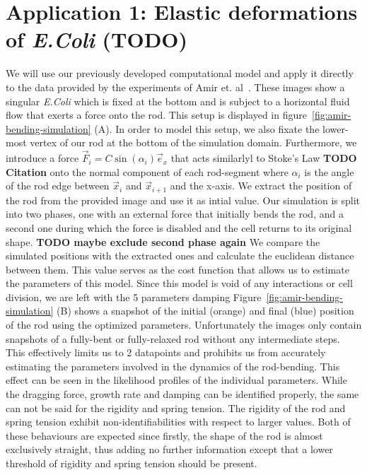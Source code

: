 \documentclass{article}
\begin{document}
\section{Application 1: Elastic deformations of \textit{E.Coli} (TODO)}
\label{section:application-1}

We will use our previously developed computational model and apply it directly to the data provided
by the experiments of Amir et. al~\cite{Amir2014,Amir2014_2}.
These images show a singular \textit{E.Coli} which is fixed at the bottom and is subject to a
horizontal fluid flow that exerts a force onto the rod.
This setup is displayed in figure~\ref{fig:amir-bending-simulation} (A).
In order to model this setup, we also fixate the lower-most vertex of our rod at the bottom of the
simulation domain.
Furthermore, we introduce a force $\vec{F}_i = C \sin(\alpha_i)\vec{e}_x$ that acts similarlyl to
Stoke's Law \textbf{TODO Citation} onto the normal component of each rod-segment where $\alpha_i$ is
the angle of the rod edge between $\vec{x}_i$ and $\vec{x}_{i+1}$ and the x-axis.
We extract the position of the rod from the provided image and use it as intial value.
Our simulation is split into two phases, one with an external force that initially bends the rod,
and a second one during which the force is disabled and the cell returns to its original shape.
\textbf{TODO maybe exclude second phase again}
We compare the simulated positions with the extracted ones and calculate the euclidean distance
between them.
This value serves as the cost function that allows us to estimate the parameters of this model.
Since this model is void of any interactions or cell division, we are left with the 5 parameters
damping 
Figure~\ref{fig:amir-bending-simulation} (B) shows a snapshot of the initial (orange) and final
(blue) position of the rod using the optimized parameters.
Unfortunately the images only contain snapshots of a fully-bent or fully-relaxed rod without any
intermediate steps.
This effectively limits us to 2 datapoints and prohibits us from accurately estimating the
parameters involved in the dynamics of the rod-bending.
This effect can be seen in the likelihood profiles of the individual parameters.
While the dragging force, growth rate and damping can be identified properly, the same can not be
said for the rigidity and spring tension.
The rigidity of the rod and spring tension exhibit non-identifiabilities with respect to larger
values.
Both of these behaviours are expected since firstly, the shape of the rod is almost exclusively
straight, thus adding no further information except that a lower threshold of rigidity and spring
tension should be present.
\end{document}
